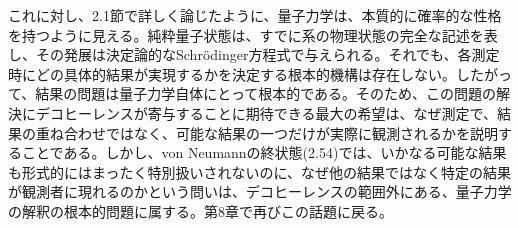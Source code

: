 \hypertarget{srcpage:60}{}\label{srcpage:60}
これに対し、2.1節で詳しく論じたように、量子力学は、本質的に確率的な性格を持つように見える。純粋量子状態は、すでに系の物理状態の完全な記述を表し、その発展は決定論的なSchrödinger方程式で与えられる。それでも、各測定時にどの具体的結果が実現するかを決定する根本的機構は存在しない。したがって、結果の問題は量子力学自体にとって根本的である。そのため、この問題の解決にデコヒーレンスが寄与することに期待できる最大の希望は、なぜ測定で、結果の重ね合わせではなく、可能な結果の一つだけが実際に観測されるかを説明することである。しかし、von Neumannの終状態(2.54)では、いかなる可能な結果も形式的にはまったく特別扱いされないのに、なぜ他の結果ではなく特定の結果が観測者に現れるのかという問いは、デコヒーレンスの範囲外にある、量子力学の解釈の根本的問題に属する。第8章で再びこの話題に戻る。
